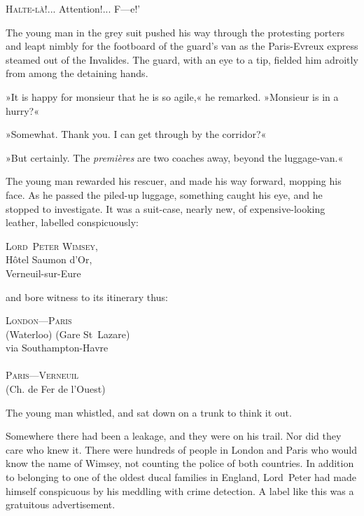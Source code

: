 
\lettrine[lines=4,ante=‘]{H}{alte-là!}... Attention!... F—e!'

\zz
The young man in the grey suit pushed his way through the protesting porters and leapt nimbly for the footboard of the guard's van as the Paris-Evreux express steamed out of the Invalides. The guard, with an eye to a tip, fielded him adroitly from among the detaining hands.

»It is happy for monsieur that he is so agile,« he remarked. »Monsieur is in a hurry?«

»Somewhat. Thank you. I can get through by the corridor?«

»But certainly. The \textit{premières} are two coaches away, beyond the luggage-van.«

The young man rewarded his rescuer, and made his way forward, mopping his face. As he passed the piled-up luggage, something caught his eye, and he stopped to investigate. It was a suit-case, nearly new, of expensive-looking leather, labelled conspicuously:

\vspace{-0.2cm}

\begin{center}
\textsc{Lord~Peter Wimsey},\\
Hôtel Saumon d'Or,\\
Verneuil-sur-Eure
\end{center}

\vspace{-0.2cm}
\noindent and bore witness to its itinerary thus:
\vspace{-0.2cm}

\begin{center}
\textsc{London—Paris}\\
(Waterloo) (Gare St~Lazare)\\
via Southampton-Havre\\
~\\
\textsc{Paris—Verneuil}\\
(Ch. de Fer de l'Ouest)
\end{center}

The young man whistled, and sat down on a trunk to think it out.

Somewhere there had been a leakage, and they were on his trail. Nor did they care who knew it. There were hundreds of people in London and Paris who would know the name of Wimsey, not counting the police of both countries. In addition to belonging to one of the oldest ducal families in England, Lord~Peter had made himself conspicuous by his meddling with crime detection. A label like this was a gratuitous advertisement.

